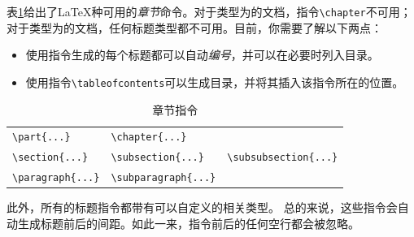 表\ref{tab:2.3}给出了\LaTeX 种可用的\emph{章节}命令。对于类型为的文档，指令\verb|\chapter|不可用；对于类型为的文档，任何标题类型都不可用。目前，你需要了解以下两点：

\begin{itemize}
  \item 使用指令生成的每个标题都可以自动\emph{编号}，并可以在必要时列入目录。
  \item 使用指令\verb|\tableofcontents|可以生成目录，并将其插入该指令所在的位置。
\end{itemize}

\begin{table}[ht]
  \centering
  \begin{tabular}{|l|l|l|}
    \hline
    \verb|\part{...}| & \verb|\chapter{...}| & \\
    \verb|\section{...}| & \verb|\subsection{...}| & \verb|\subsubsection{...}| \\
    \verb|\paragraph{...}| & \verb|\subparagraph{...}| &  \\
    \hline
  \end{tabular}
  \caption{章节指令}
  \label{tab:2.3}
\end{table}

\begin{ii}
此外，所有的标题指令都带有可以自定义的相关类型。%
总的来说，这些指令会自动生成标题前后的间距。如此一来，指令前后的任何空行都会被忽略。
\end{ii}

